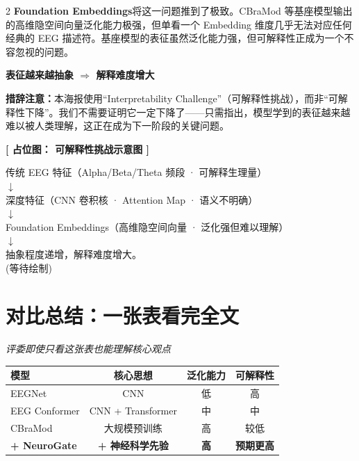 \documentclass[12pt, a0paper]{article}
\renewcommand{\Large}{\fontsize{34}{42}\selectfont}
\renewcommand{\small}{\fontsize{18}{24}\selectfont}
\newcommand{\placeholder}[2]{%
    \begin{center}
    \colorbox{mygray!12}{\parbox{0.9\columnwidth}{%
        \centering
        \vspace{1.5em}
        {\Large\bfseries\color{mygray} [ 占位图： #1 ]}
        \vspace{1em}

        {\small\color{mygray} #2}
        \vspace{1.5em}
    }}
    \end{center}
}
\begin{document}
\begin{multicols}{2}
\textbf{Foundation Embeddings}将这一问题推到了极致。CBraMod 等基座模型输出的高维隐空间向量泛化能力极强，但单看一个 Embedding 维度几乎无法对应任何经典的 EEG 描述符。基座模型的表征虽然泛化能力强，但可解释性正成为一个不容忽视的问题。

\begin{center}
\colorbox{myorange!10}{\parbox{0.95\columnwidth}{\centering\bfseries
    表征越来越抽象 \quad $\Rightarrow$ \quad 解释难度增大}}
\end{center}

\vspace{1em}

\textbf{措辞注意：}本海报使用“Interpretability Challenge”（可解释性挑战），而非“可解释性下降”。我们不需要证明它一定下降了——只需指出，模型学到的表征越来越难以被人类理解，这正在成为下一阶段的关键问题。

\placeholder{可解释性挑战示意图}{%
    传统 EEG 特征（Alpha/Beta/Theta 频段 · 可解释生理量）\\
    $\downarrow$\\
    深度特征（CNN 卷积核 · Attention Map · 语义不明确）\\
    $\downarrow$\\
    Foundation Embeddings（高维隐空间向量 · 泛化强但难以理解）\\
    $\downarrow$\\
    抽象程度递增，解释难度增大。\\
    \small (等待绘制)}

\section{对比总结：一张表看完全文}

\begin{center}
{\small\itshape\color{mygray} 评委即使只看这张表也能理解核心观点}

\vspace{1em}

\begin{tabular}{|l|c|c|c|}
    \hline
    \textbf{模型} & \textbf{核心思想} & \textbf{泛化能力} & \textbf{可解释性} \\
    \hline
    EEGNet        & CNN               & \textcolor{myred}{低}    & \textcolor{mygreen}{高}     \\
    \hline
    EEG Conformer & CNN + Transformer & \textcolor{myorange}{中}  & \textcolor{myorange}{中}    \\
    \hline
    CBraMod       & 大规模预训练      & \textcolor{mygreen}{高}   & \textcolor{myred}{较低}     \\
    \hline
    \rowcolor{mygreen!10}
    \textbf{+ NeuroGate} & \textbf{+ 神经科学先验} & \textcolor{mygreen}{\textbf{高}} & \textcolor{myblue}{\textbf{预期更高}} \\
    \hline
\end{tabular}
\end{center}


\end{multicols}
\end{document}
